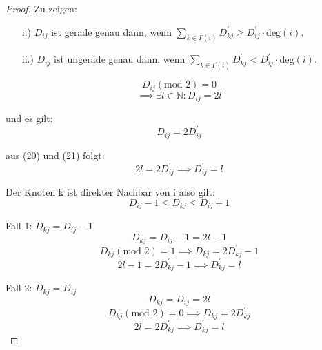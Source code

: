 \documentclass{article}
\begin{document}
\begin{proof}
\noindent
Zu zeigen:
\begin{enumerate}
  \item[i.)] $D_{ij}$ ist gerade genau dann, wenn $\sum_{k \in \Gamma(i)} D^{'}_{kj} \geq D^{'}_{ij} \cdot \text{deg}(i)$.
  \item[ii.)] $D_{ij}$ ist ungerade genau dann, wenn $\sum_{k \in \Gamma(i)} D^{'}_{kj} < D^{'}_{ij} \cdot \text{deg}(i)$.
\end{enumerate}

\begin{equation}
  D_{ij}(\text{mod } 2) = 0
\end{equation}
\begin{equation}
  \implies \exists l \in \mathbb{N}: D_{ij} = 2l
\end{equation}

\noindent
und es gilt:
\begin{equation}
  D_{ij} = 2D^{'}_{ij}
\end{equation}

\noindent
aus (20) und (21) folgt: 
\begin{equation}
  2l = 2D^{'}_{ij} \implies D^{'}_{ij} = l
\end{equation}

\noindent
Der Knoten k ist direkter Nachbar von i also gilt:
\begin{equation}
  D_{ij} - 1 \leq D_{kj} \leq D_{ij} + 1
\end{equation}

\noindent
Fall 1: $D_{kj} = D_{ij} - 1$
\begin{equation}
  D_{kj} = D_{ij} - 1  = 2l - 1
\end{equation}
\begin{equation}
  D_{kj}(\text{mod } 2) = 1 \implies D_{kj} = 2D^{'}_{kj} - 1
\end{equation}
\begin{equation}
2l - 1 = 2D^{'}_{kj} - 1 \implies D^{'}_{kj} = l
\end{equation}

\noindent
Fall 2: $D_{kj} = D_{ij}$
\begin{equation}
  D_{kj} = D_{ij} = 2l
\end{equation}
\begin{equation}
  D_{kj}(\text{mod } 2) = 0 \implies D_{kj} = 2D^{'}_{kj}
\end{equation}
\begin{equation}
 2l = 2D^{'}_{kj} \implies D^{'}_{kj} = l
\end{equation}


\end{proof}
\end{document}
